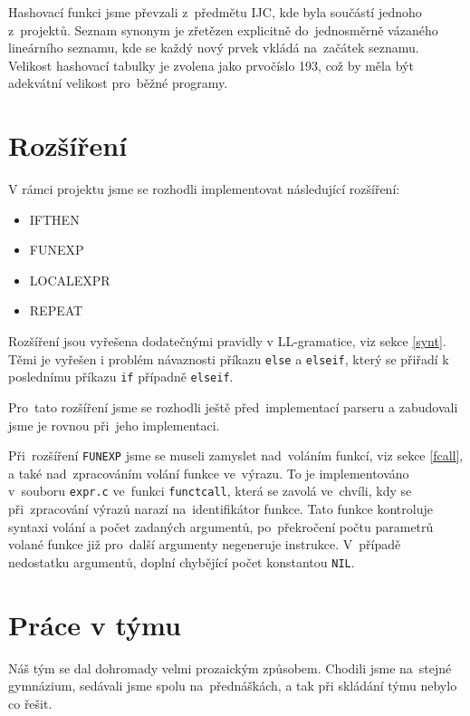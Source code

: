 \documentclass[12pt,a4paper,titlepage,final]{article}
\begin{document}
Hashovací funkci jsme převzali z~předmětu IJC, kde byla součástí jednoho z~projektů.
Seznam synonym je zřetězen explicitně do~jednosměrně vázaného lineárního seznamu, kde
se každý nový prvek vkládá na~začátek seznamu. Velikost hashovací tabulky je zvolena
jako prvočíslo 193, což by měla být adekvátní velikost pro~běžné programy.

\section{Rozšíření}
V rámci projektu jsme se rozhodli implementovat následující rozšíření:
\begin{itemize}
  \item IFTHEN
  \item FUNEXP
  \item LOCALEXPR
  \item REPEAT
\end{itemize}

Rozšíření jsou vyřešena dodatečnými pravidly v LL-gramatice, viz sekce \ref{synt}.
Těmi je vyřešen i problém návaznosti příkazu \texttt{else} a \texttt{elseif}, který se přiřadí
k poslednímu příkazu \texttt{if} případně \texttt{elseif}.

Pro~tato rozšíření jsme se rozhodli ještě před~implementací parseru a zabudovali jsme je rovnou
při~jeho implementaci.

Při~rozšíření \texttt{FUNEXP} jsme se museli zamyslet nad~voláním funkcí, viz sekce \ref{fcall},
a také nad~zpracováním volání funkce ve~výrazu. To je implementováno v~souboru \texttt{expr.c}
ve~funkci \texttt{functcall}, která se zavolá ve~chvíli, kdy se při~zpracování výrazů narazí
na~identifikátor funkce. Tato funkce kontroluje syntaxi volání a počet zadaných argumentů, po~překročení
počtu parametrů volané funkce již pro~další argumenty negeneruje instrukce. V~případě
nedostatku argumentů, doplní chybějící počet konstantou \texttt{NIL}.


\section{Práce v týmu}
Náš tým se dal dohromady velmi prozaickým způsobem. Chodili jsme na~stejné gymnázium,
 sedávali jsme spolu na~přednáškách, a tak při skládání týmu nebylo co řešit.
\end{document}
